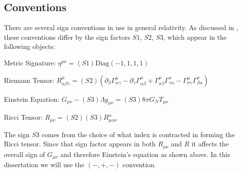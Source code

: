 \begin{subappendices}
\section{Conventions}\label{app:conventions}

There are several sign conventions in use in general relativity.  As discussed in \cite{hobson}, these conventions differ by the sign factors $S1$, $S2$, $S3$, which appear in the following objects:
\vspace{3mm}

Metric Signature: $\eta^{\mu\nu}=(S1)\text{Diag}(-1,1,1,1)$
\vspace{3mm}

Riemann Tensor: $R^\mu_{\alpha\beta\gamma}=(S2)(\partial_{\beta}\Gamma^\mu_{\alpha\gamma}-\partial_{\gamma}\Gamma^\mu_{\alpha\beta}+\Gamma^\mu_{\sigma\beta}\Gamma^\sigma_{\gamma\alpha}-\Gamma^\mu_{\sigma\gamma}\Gamma^\sigma_{\beta\alpha})$
\vspace{3mm}

Einstein Equation: $G_{\mu\nu}-(S3)\Lambda g_{\mu\nu}=(S3)8\pi G_NT_{\mu\nu}$
\vspace{3mm}

Ricci Tensor: $R_{\mu\nu}=(S2)(S3)R^\alpha_{\mu\alpha\nu}$
\vspace{3mm}

The sign $S3$ comes from the choice of what index is contracted in forming the Ricci tensor.  Since that sign factor appears in both $R_{\mu\nu}$ and $R$ it affects the overall sign of $G_{\mu\nu}$ and therefore Einstein's equation as shown above. In this dissertation we will use the $(-,+,-)$ convention.


\end{subappendices}

